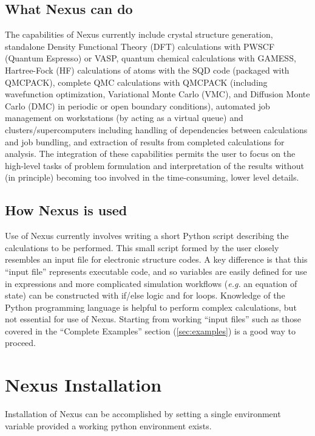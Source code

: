 \documentclass[oneside,11pt]{memoir}
\numberwithin{equation}{section}
\begin{document}
\section{What Nexus can do}
The capabilities of Nexus currently include crystal structure 
generation, standalone Density Functional Theory (DFT) calculations with 
PWSCF (Quantum Espresso) or VASP,  quantum chemical calculations with GAMESS,  
Hartree-Fock (HF) calculations of atoms with the SQD code (packaged with 
QMCPACK), complete QMC calculations with QMCPACK (including wavefunction 
optimization, Variational Monte Carlo (VMC), and Diffusion Monte Carlo (DMC) in 
periodic or open boundary conditions), automated job management on workstations 
(by acting as a virtual queue) and clusters/supercomputers  
including handling of dependencies 
between calculations and job bundling,  and extraction of results from 
completed calculations for analysis.  The integration of these capabilities 
permits the user to focus on the high-level tasks of problem formulation and 
interpretation of the results without (in principle) becoming too involved 
in the time-consuming, lower level details.

\section{How Nexus is used}
Use of Nexus currently involves writing a short Python script 
describing the calculations to be performed.  This small script formed by the 
user closely resembles an input file for electronic structure codes.  A key 
difference is that this ``input file'' represents executable code, and so 
variables are easily defined for use in expressions and more complicated 
simulation workflows (\emph{e.g.} an equation of state) can be constructed 
with if/else logic and for loops.  Knowledge of the Python programming language 
is helpful to perform complex calculations, but not essential for use of  
Nexus.  Starting from working ``input files'' such as those covered 
in the ``Complete Examples'' section (\ref{sec:examples}) is a good way to proceed. 




\pagebreak
\chapter{Nexus Installation} \label{sec:installation}
Installation of Nexus can be accomplished by 
setting a single environment variable provided a 
working python environment exists. 
\end{document}
